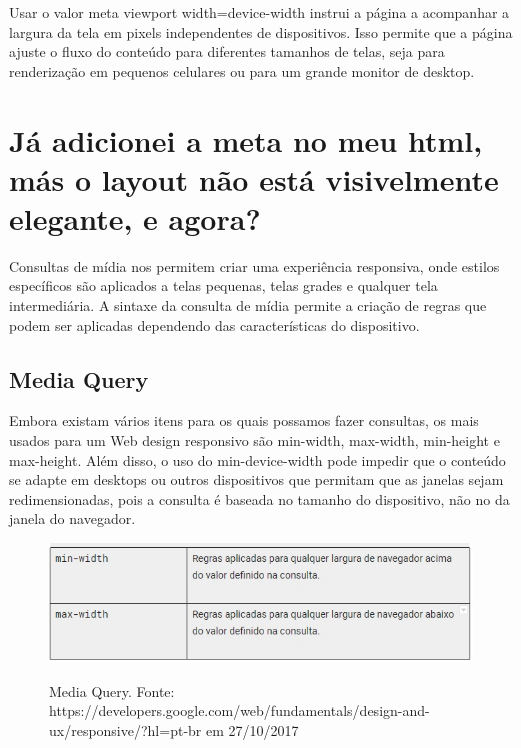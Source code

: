\documentclass[12pt,a4paper]{article}
\begin{document}
Usar o valor meta viewport width=device-width instrui a página a acompanhar a largura da tela em pixels independentes de dispositivos. Isso permite que a página ajuste o fluxo do conteúdo para diferentes tamanhos de telas, seja para renderização em pequenos celulares ou para um grande monitor de desktop.


\section{Já adicionei a meta no meu html, más o layout não está visivelmente elegante, e agora?
}
Consultas de mídia nos permitem criar uma experiência responsiva, onde estilos específicos são aplicados a telas pequenas, telas grades e qualquer tela intermediária. A sintaxe da consulta de mídia permite a criação de regras que podem ser aplicadas dependendo das características do dispositivo.

\subsection{Media Query} 


Embora existam vários itens para os quais possamos fazer consultas, os mais usados para um Web design responsivo são min-width, max-width, min-height e max-height.
Além disso, o uso do min-device-width pode impedir que o conteúdo se adapte em desktops ou outros dispositivos que permitam que as janelas sejam redimensionadas, pois a consulta é baseada no tamanho do dispositivo, não no da janela do navegador.

\begin{figure}[!htb]
\centering
\includegraphics[width=15cm]{recursos/1.jpg}
\label{Media}
\caption{Media Query. Fonte: https://developers.google.com/web/fundamentals/design-and-ux/responsive/?hl=pt-br em 27/10/2017}
\end{figure}
\end{document}
